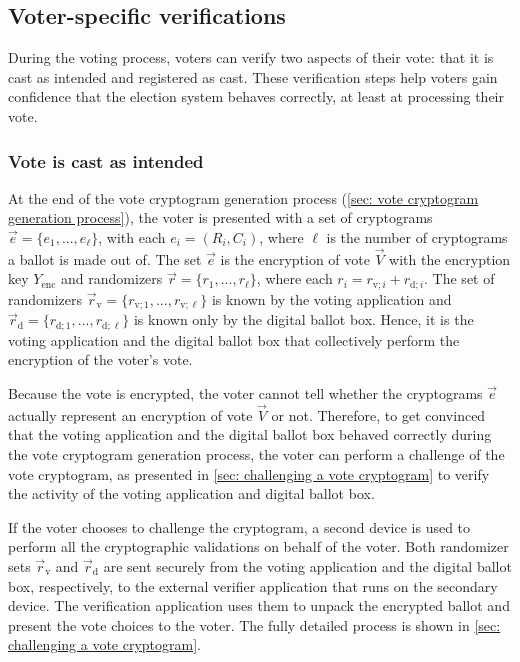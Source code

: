 \subsection{Voter-specific verifications} \label{sec: voter-specific verifications}
During the voting process, voters can verify two aspects of their vote: that it is cast as intended and registered as cast. These verification steps help voters gain confidence that the election system behaves correctly, at least at processing their vote.


\subsubsection{Vote is cast as intended}
At the end of the vote cryptogram generation process (\cref{sec: vote cryptogram generation process}), the voter is presented with a set of cryptograms $\vec{e} = \{ e_1, ..., e_\ell \}$, with each $e_i = (R_i, C_i)$, where $\ell$ is the number of cryptograms a ballot is made out of. The set $\vec{e}$ is the encryption of vote $\vec{V}$ with the encryption key $Y_\mathrm{enc}$ and randomizers $\vec{r} = \{ r_1, ..., r_\ell \}$, where each $r_i = r_{\mathrm{v}; i} + r_{\mathrm{d}; i}$. The set of randomizers $\vec{r}_\mathrm{v} = \{ r_{\mathrm{v}; 1}, ..., r_{\mathrm{v}; \ell} \}$ is known by the voting application and $\vec{r}_\mathrm{d} = \{ r_{\mathrm{d}; 1}, ..., r_{\mathrm{d}; \ell} \}$ is known only by the digital ballot box. Hence, it is the voting application and the digital ballot box that collectively perform the encryption of the voter's vote.

Because the vote is encrypted, the voter cannot tell whether the cryptograms $\vec{e}$ actually represent an encryption of vote $\vec{V}$ or not. Therefore, to get convinced that the voting application and the digital ballot box behaved correctly during the vote cryptogram generation process, the voter can perform a challenge of the vote cryptogram, as presented in \cref{sec: challenging a vote cryptogram} to verify the activity of the voting application and digital ballot box.

If the voter chooses to challenge the cryptogram, a second device is used to perform all the cryptographic validations on behalf of the voter. Both randomizer sets $\vec{r}_\mathrm{v}$ and $\vec{r}_\mathrm{d}$ are sent securely from the voting application and the digital ballot box, respectively, to the external verifier application that runs on the secondary device. The verification application uses them to unpack the encrypted ballot and present the vote choices to the voter. The fully detailed process is shown in \cref{sec: challenging a vote cryptogram}.

